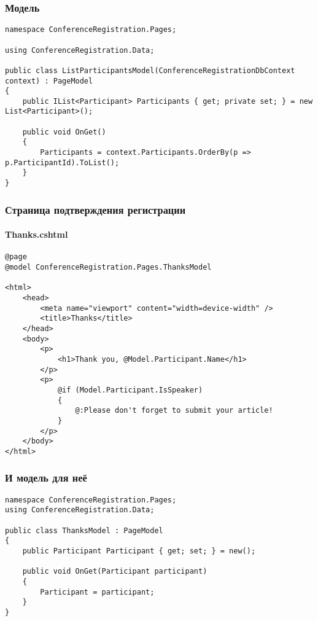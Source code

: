 \documentclass{../../slides-style}
\begin{document}
    \begin{frame}[fragile]
        \frametitle{Модель}
        \begin{footnotesize}
            \begin{verbatim}
namespace ConferenceRegistration.Pages;

using ConferenceRegistration.Data;

public class ListParticipantsModel(ConferenceRegistrationDbContext context) : PageModel
{
    public IList<Participant> Participants { get; private set; } = new List<Participant>();

    public void OnGet()
    {
        Participants = context.Participants.OrderBy(p => p.ParticipantId).ToList();
    }
}
            \end{verbatim}
        \end{footnotesize}
    \end{frame}

    \begin{frame}[fragile]
        \frametitle{Страница подтверждения регистрации}
        \framesubtitle{Thanks.cshtml}
        \begin{scriptsize}
            \begin{verbatim}
@page
@model ConferenceRegistration.Pages.ThanksModel

<html>
    <head>
        <meta name="viewport" content="width=device-width" />
        <title>Thanks</title>
    </head>
    <body>
        <p>
            <h1>Thank you, @Model.Participant.Name</h1>
        </p>
        <p>
            @if (Model.Participant.IsSpeaker)
            {
                @:Please don't forget to submit your article!
            }
        </p>
    </body>
</html>
            \end{verbatim}
        \end{scriptsize}
    \end{frame}

    \begin{frame}[fragile]
        \frametitle{И модель для неё}
        \begin{footnotesize}
            \begin{verbatim}
namespace ConferenceRegistration.Pages;
using ConferenceRegistration.Data;

public class ThanksModel : PageModel
{
    public Participant Participant { get; set; } = new();

    public void OnGet(Participant participant)
    {
        Participant = participant;
    }
}
            \end{verbatim}
        \end{footnotesize}
    \end{frame}
\end{document}
